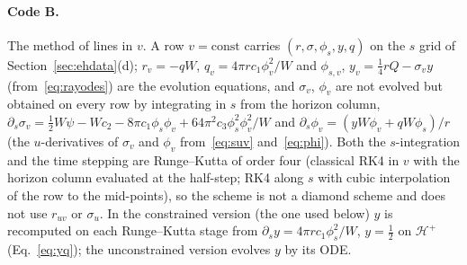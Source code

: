 \documentclass[11pt]{article}
\begin{document}
\paragraph{Code B.} The method of lines in $v$. A row $v=\mathrm{const}$ carries $(r,\sigma,\phi_s,y,q)$ on the $s$ grid of Section~\ref{sec:ehdata}(d); $r_v=-qW$, $q_v=4\pi rc_1\phi_v^{2}/W$ and $\phi_{s,v}$, $y_v=\tfrac14rQ-\sigma_vy$ (from~\eqref{eq:rayodes}) are the evolution equations, and $\sigma_v$, $\phi_v$ are not evolved but obtained on every row by integrating in $s$ from the horizon column, $\partial_s\sigma_v=\tfrac12W\psi-Wc_2-8\pi c_1\phi_s\phi_v+64\pi^{2}c_3\phi_s^{2}\phi_v^{2}/W$ and $\partial_s\phi_v=(yW\phi_v+qW\phi_s)/r$ (the $u$-derivatives of $\sigma_v$ and $\phi_v$ from~\eqref{eq:suv} and~\eqref{eq:phi}). Both the $s$-integration and the time stepping are Runge--Kutta of order four (classical RK4 in $v$ with the horizon column evaluated at the half-step; RK4 along $s$ with cubic interpolation of the row to the mid-points), so the scheme is not a diamond scheme and does not use $r_{uv}$ or $\sigma_u$. In the constrained version (the one used below) $y$ is recomputed on each Runge--Kutta stage from $\partial_sy=4\pi rc_1\phi_s^{2}/W$, $y=\tfrac12$ on $\mathcal H^{+}$ (Eq.~\eqref{eq:yq}); the unconstrained version evolves $y$ by its ODE.
\end{document}
